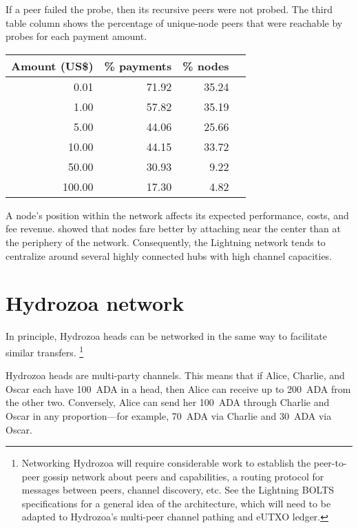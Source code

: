 \documentclass[11pt,a4paper,oneside]{article}
\begin{document}
\begin{multicols}{2}
{  If a peer failed the probe, then its recursive peers were not probed.
  The third table column shows the percentage of unique-node peers that were reachable by probes for each payment amount.
}

\begin{figure-multicol}
\begin{tabular}{rrrr}\toprule
  Amount (US\$) & \% payments & \% nodes \\ \midrule
    0.01 & 71.92 & 35.24 \\
    1.00 & 57.82 & 35.19 \\
    5.00 & 44.06 & 25.66 \\
   10.00 & 44.15 & 33.72 \\
   50.00 & 30.93 &  9.22 \\
  100.00 & 17.30 &  4.82 \\ \bottomrule
\end{tabular}
\end{figure-multicol}

A node's position within the network affects its expected performance, costs, and fee revenue.
\citet{LangeEtAlImpactAttachmentStrategies2021a} showed that nodes fare better by attaching near the center than at the periphery of the network.
Consequently, the Lightning network tends to centralize around several highly connected hubs with high channel capacities.

\section{Hydrozoa network}%
\label{h:hydrozoa-network}

In principle, Hydrozoa heads can be networked in the same way to facilitate similar transfers.%
\footnote{Networking Hydrozoa will require considerable work to establish the peer-to-peer gossip network about peers and capabilities, a routing protocol for messages between peers, channel discovery, etc.
  See the Lightning BOLTS specifications \citep{LightningNetworkBasisLightningTechnology2024} for a general idea of the architecture, which will need to be adapted to Hydrozoa's multi-peer channel pathing and eUTXO ledger.}

Hydrozoa heads are multi-party channels.
This means that if Alice, Charlie, and Oscar each have 100~ADA in a head, then Alice can receive up to 200~ADA from the other two.
Conversely, Alice can send her 100~ADA through Charlie and Oscar in any proportion---for example, 70~ADA via Charlie and 30~ADA via Oscar.


\end{multicols}
\end{document}
